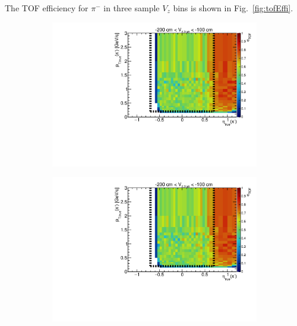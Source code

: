 \noindent The TOF efficiency for $\pi^-$ in three sample $V_z$ bins is shown in Fig.~\ref{fig:tofEffi}.
\begin{figure}[h!]
	\centering
	\begin{subfigure}{.49\textwidth}
		\includegraphics[width=\textwidth,page=3]{chapters/chrgSTAR/img/tofEff/Eff2D_TOF_pion_Minus.pdf}
	\end{subfigure}
	\begin{subfigure}{.49\textwidth}
		\includegraphics[width=\textwidth,page=11]{chapters/chrgSTAR/img/tofEff/Eff2D_TOF_pion_Minus.pdf}
	\end{subfigure}
	\begin{subfigure}{.49\textwidth}

\end{subfigure}
\end{figure}
